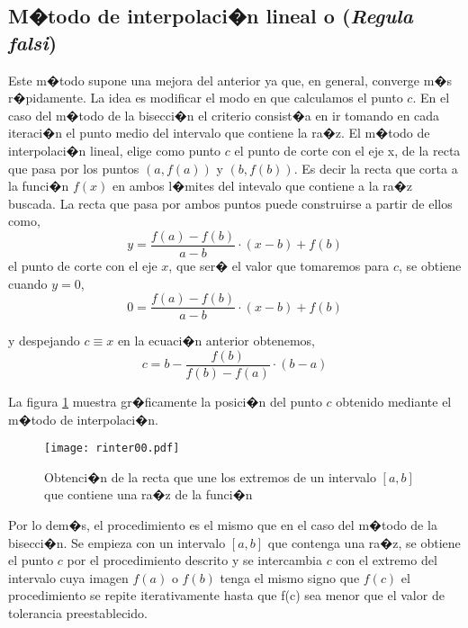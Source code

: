 \subsection{M�todo de interpolaci�n lineal o (\emph{Regula falsi})}
Este m�todo supone una mejora del anterior ya que, en general,  converge m�s r�pidamente. La idea es modificar el modo en que calculamos el punto $c$. En el caso del m�todo de la bisecci�n el criterio consist�a en ir tomando en cada iteraci�n el punto medio del intervalo que contiene la ra�z. El m�todo de interpolaci�n lineal, elige como punto $c$ el punto de corte con el eje x, de la recta que pasa por los puntos $\left(a,f(a)\right)$ y $\left(b,f(b)\right)$. Es decir la recta que corta a la funci�n $f(x)$ en ambos l�mites del intevalo que contiene a la ra�z buscada. La recta que pasa por ambos puntos puede construirse a partir de ellos como,
\begin{equation*}
y=\frac{f(a)-f(b)}{a-b}\cdot(x-b)+f(b)
\end{equation*}
el punto de corte con el eje $x$, que ser� el valor que tomaremos para $c$, se obtiene cuando $y=0$,
\begin{equation*}
0=\frac{f(a)-f(b)}{a-b}\cdot(x-b)+f(b)
\end{equation*}

y despejando $c\equiv x$ en la ecuaci�n anterior obtenemos,
\begin{equation*}
c=b-\frac{f(b)}{f(b)-f(a)}\cdot(b-a)
\end{equation*}

La figura \ref{fig:regulaf} muestra  gr�ficamente la posici�n del punto $c$ obtenido mediante el m�todo de interpolaci�n. 

\begin{figure}[h]
\centering
\texttt{[image: rinter00.pdf]}

\caption{Obtenci�n de la recta que une los extremos de un intervalo $[a,b]$  que contiene una ra�z de la funci�n}
\label{fig:regulaf}
\end{figure}

Por lo dem�s, el procedimiento es el mismo que en el caso del m�todo de la bisecci�n. Se empieza con un intervalo $[a,b]$ que  contenga una ra�z, se obtiene el punto $c$ por el procedimiento descrito y se intercambia $c$ con el extremo del intervalo cuya imagen $f(a)$ o $f(b)$ tenga el mismo signo que $f(c)$ el procedimiento se repite iterativamente hasta que f(c) sea menor que el valor de tolerancia preestablecido. 

